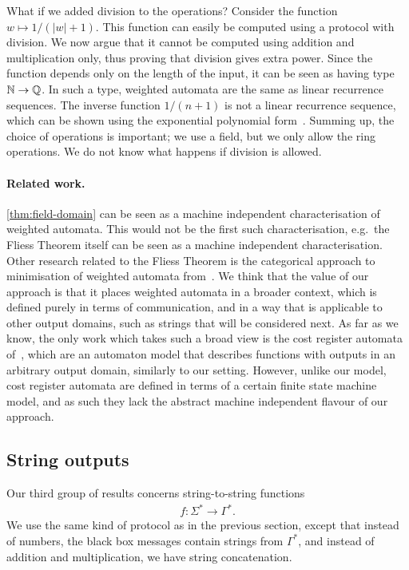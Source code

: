 \begin{myexample}[Division]\label{ex:division} What if we added division to the operations?  Consider the function  $w \mapsto 1/(|w|+1)$. This function can easily be computed using a protocol with division. We now argue that it cannot be computed using addition and multiplication only, thus proving that division gives extra power. Since the function depends only on the length of the input, it can be seen as having type ${\mathbb N} \to {\mathbb Q}$. In such a type, weighted automata are the same as linear recurrence sequences. The inverse function $1/(n+1)$ is not a  linear recurrence sequence, which can be shown using the exponential polynomial form~\cite[Theorem 2.1]{BerstelReutenauer08}. Summing up, the choice of operations is important; we use a field, but we only allow the ring operations. We do not know what happens if division is allowed.
\end{myexample}

\paragraph*{Related work.} \cref{thm:field-domain} can be seen as a machine independent characterisation of  weighted automata. This would not be the first such characterisation, e.g.~the Fliess Theorem itself can be seen as a machine independent characterisation. Other research related to the Fliess Theorem is the categorical approach to  minimisation of weighted automata from~\cite{colcombetPetrisan2017}. We think that the value of our approach is that it places weighted automata in a broader context, which is defined purely in terms of communication, and in a way that is applicable to  other output domains, such as strings that will be considered next. As far as we know, the only  work  which takes such a broad view is the cost register automata of~\cite[Section C]{alurDantoniDeshmukhYuan2013}, which are an automaton model that describes functions with outputs in an arbitrary output domain, similarly to our setting. However, unlike our model, cost register automata are defined in terms of a certain finite state machine model, and as such they lack the abstract machine independent flavour of our approach.

\subsection{String outputs}
\label{sec:intro-strings}

Our third group of results concerns string-to-string functions
\begin{align*}
f : \Sigma^* \to \Gamma^*.
\end{align*}
We  use the same kind of protocol as in the previous section, except that instead of numbers, the black box messages  contain strings from $\Gamma^*$, and instead of addition and multiplication, we have string concatenation.  

